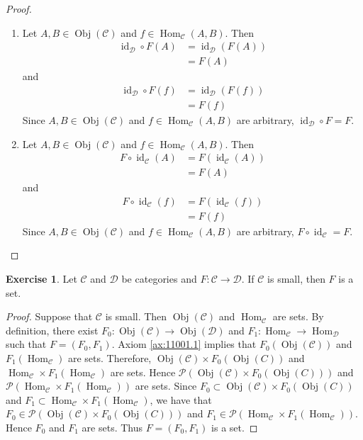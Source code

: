 \documentclass[12pt]{amsart}
\theoremstyle{definition}
\newtheorem{ex}[definition]{Exercise}
\newcommand{\MC}{\mathcal{C}}
\newcommand{\MD}{\mathcal{D}}
\newcommand{\MP}{\mathcal{P}}
\DeclareMathOperator{\id}{id}
\DeclareMathOperator{\Obj}{Obj}
\DeclareMathOperator{\Hom}{Hom}
\DeclareMathOperator*{\0}{\mbf{0}}
\DeclareMathOperator*{\1}{\mbf{1}}
\newcommand{\lex}[1]{\label{ex:#1}}
\newcommand{\rax}[1]{Axiom \ref{ax:#1}}
\begin{document}
	\begin{proof}\
		\begin{enumerate}
			\item Let $A, B \in \Obj(\MC)$ and $f \in \Hom_{\MC}(A, B)$. Then 
			\begin{align*}
				\id_{\MD} \circ F(A) 
				& = \id_{\MD}(F(A)) \\
				& = F(A)
			\end{align*}
			and 
			\begin{align*}
				\id_{\MD} \circ F(f) 
				& = \id_{\MD}(F(f)) \\
				& = F(f)
			\end{align*} 
			Since $A, B \in \Obj(\MC)$ and $f \in \Hom_{\MC}(A, B)$ are arbitrary, $\id_{\MD} \circ F = F$.
			\item Let $A, B \in \Obj(\MC)$ and $f \in \Hom_{\MC}(A, B)$. Then
			\begin{align*}
				F \circ \id_{\MC}(A) 
				& = F(\id_{\MC}(A)) \\
				& = F(A) 
			\end{align*}
			and 
			\begin{align*}
				F \circ \id_{\MC}(f) 
				& = F (\id_{\MC}(f)) \\
				& = F(f)
			\end{align*} 
			Since $A, B \in \Obj(\MC)$ and $f \in \Hom_{\MC}(A, B)$ are arbitrary, $ F \circ \id_{\MC} = F$.
		\end{enumerate}
	\end{proof}
	
	\begin{ex} \lex{13008.1}
		Let $\MC$ and $\MD$ be categories and $F:\MC \rightarrow \MD$. If $\MC$ is small, then $F$ is a set.
	\end{ex}
	
	\begin{proof}
		Suppose that $\MC$ is small. Then $\Obj(\MC)$ and $\Hom_{\MC}$ are sets. By definition, there exist $F_0: \Obj(\MC) \rightarrow \Obj(\MD)$ and $F_1: \Hom_{\MC} \rightarrow \Hom_{\MD}$ such that $F = (F_0, F_1)$. \rax{11001.1} implies that $F_0(\Obj(\MC))$ and $F_1(\Hom_{\MC})$ are sets. Therefore, $\Obj(\MC) \times F_0(\Obj(C))$ and $\Hom_{\MC} \times F_1(\Hom_{\MC})$ are sets. Hence $\MP(\Obj(\MC) \times F_0(\Obj(C)))$ and $\MP(\Hom_{\MC} \times F_1(\Hom_{\MC}))$ are sets. Since $F_0 \subset \Obj(\MC) \times F_0(\Obj(C))$ and $F_1 \subset \Hom_{\MC} \times F_1(\Hom_{\MC})$, we have that $F_0 \in \MP(\Obj(\MC) \times F_0(\Obj(C)))$ and $F_1 \in \MP(\Hom_{\MC} \times F_1(\Hom_{\MC}))$. Hence $F_0$ and $F_1$ are sets. Thus $F = (F_0, F_1)$ is a set. 
	\end{proof}
\end{document}
